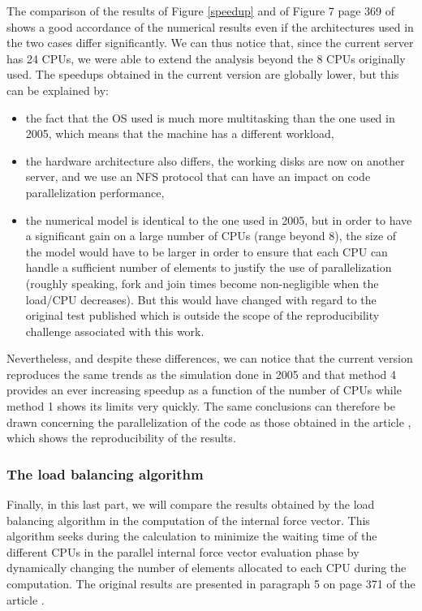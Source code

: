 The comparison of the results of Figure \ref{speedup} and of Figure 7 page 369 of \cite{Pantale:2005} shows a good accordance of the numerical results even if the architectures used in the two cases differ significantly. We can thus notice that, since the current server has 24 CPUs, we were able to extend the analysis beyond the 8 CPUs originally used. The speedups obtained in the current version are globally lower, but this can be explained by:
\begin{itemize}
\item the fact that the OS used is much more multitasking than the one used in 2005, which means that the machine has a different workload,
\item the hardware architecture also differs, the working disks are now on another server, and we use an NFS protocol that can have an impact on code parallelization performance,
\item the numerical model is identical to the one used in 2005, but in order to have a significant gain on a large number of CPUs (range beyond 8), the size of the model would have to be larger in order to ensure that each CPU can handle a sufficient number of elements to justify the use of parallelization (roughly speaking, fork and join times become non-negligible when the load/CPU decreases). But this would have changed with regard to the original test published which is outside the scope of the reproducibility challenge associated with this work.
\end{itemize}
Nevertheless, and despite these differences, we can notice that the current version reproduces the same trends as the simulation done in 2005 and that method 4 provides an ever increasing speedup as a function of the number of CPUs while method 1 shows its limits very quickly. The same conclusions can therefore be drawn concerning the parallelization of the code as those obtained in the article \cite{Pantale:2005}, which shows the reproducibility of the results.

\subsubsection{The load balancing algorithm}

Finally, in this last part, we will compare the results obtained by the load balancing algorithm in the computation of the internal force vector. This algorithm seeks during the calculation to minimize the waiting time of the different CPUs in the parallel internal force vector evaluation phase by dynamically changing the number of elements allocated to each CPU during the computation. The original results are presented in paragraph 5 on page 371 of the article \cite{Pantale:2005}.

